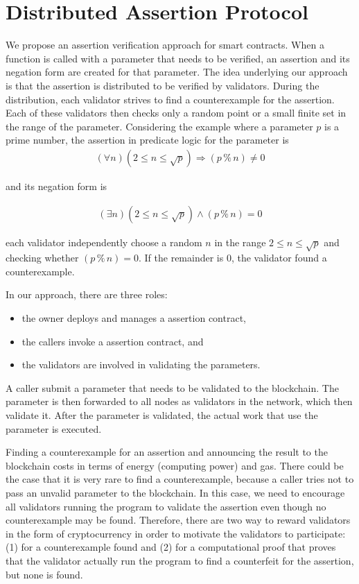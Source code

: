 \documentclass[runningheads]{llncs}
\begin{document}
\section{Distributed Assertion Protocol}
\label{sec:approach}
We propose an assertion verification approach for smart contracts. When a function is called with a parameter that needs to be verified, an assertion and its negation form are created for that parameter. The idea underlying our approach is that the assertion is distributed to be verified by validators. During the distribution, each validator strives to find a counterexample for the assertion. Each of these validators then checks only a random point or a small finite set  in the range of the parameter. Considering the example where a parameter $p$ is a prime number, the assertion in predicate logic for the parameter is 
\begin{gather}\label{eq:3a}
  (\forall n) (2 \le n \le \sqrt p) \Rightarrow (p \mathbin{\%} n) \ne 0
\end{gather}


\noindent and its negation form is 

\begin{gather}\label{eq:3b}
  (\exists n) (2 \le n \le \sqrt p) \wedge (p \mathbin{\%} n) = 0
\end{gather}

\noindent each validator independently choose a
random $n$ in the range $2 \le n \le 
\sqrt p$ and checking whether $(p \mathbin{\%} n) = 0$. If the remainder is $0$, the validator found a counterexample.

In our approach, there are three roles: 
\begin{itemize}
   \item the owner deploys and manages a assertion contract, 
   \item the callers invoke a assertion contract, and 
   \item the validators are involved in validating the parameters. 
\end{itemize}

\noindent A caller submit a parameter that needs to be validated to the blockchain. The parameter is  then forwarded to all nodes as validators in the network, which then validate it. After the parameter is validated, the actual work that use the parameter is executed. 

Finding a counterexample for an assertion and announcing the result to the blockchain costs in terms of energy (computing power) and gas. There could be the case that it is very rare to find a counterexample, because a caller tries not to pass an unvalid parameter to the blockchain. In this case, we need to encourage all validators running the program to validate the assertion even though no counterexample may be found. Therefore, there are two way to reward validators in the form of cryptocurrency in order to motivate the validators to participate: (1) for a  counterexample found and (2) for a computational proof that proves that the validator actually run the program to find a counterfeit for the assertion, but none is found. 
\end{document}

